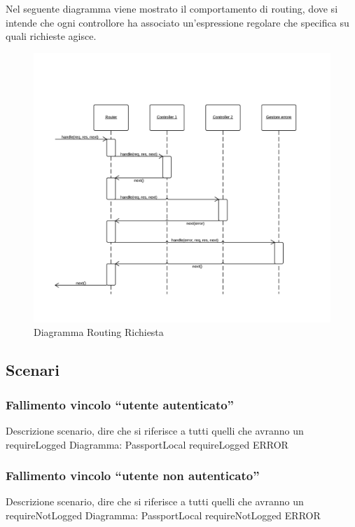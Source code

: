 Nel seguente diagramma viene mostrato il comportamento di routing, dove si intende che ogni controllore ha associato un'espressione regolare che specifica su quali richieste agisce. 
\begin{figure}[H]
	\begin{center} 
		\includegraphics[scale=0.30]{scenari/Diagramma Routing Richiesta.png} 
		\caption{Diagramma Routing Richiesta}
	\end{center} 
\end{figure}

\subsection{Scenari}

\subsubsection{Fallimento vincolo ``utente autenticato''}
Descrizione scenario, dire che si riferisce a tutti quelli che avranno un requireLogged
Diagramma: PassportLocal requireLogged ERROR

\subsubsection{Fallimento vincolo ``utente non autenticato''}
Descrizione scenario, dire che si riferisce a tutti quelli che avranno un requireNotLogged
Diagramma: PassportLocal requireNotLogged ERROR


